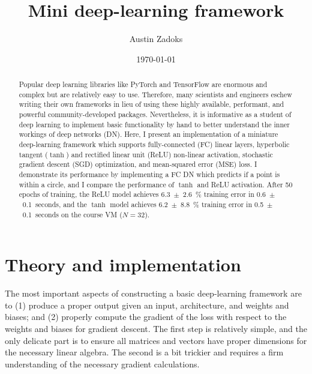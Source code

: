 \documentclass[prl, article, twocolumn]{revtex4-1}
\begin{document}
\title{Mini deep-learning framework}
\date{\today}
\author{Austin Zadoks}
\noaffiliation

\begin{abstract}
Popular deep learning libraries like PyTorch and TensorFlow are enormous and complex but are relatively easy to use. Therefore, many scientists and engineers eschew writing their own frameworks in lieu of using these highly available, performant, and powerful community-developed packages. Nevertheless, it is informative as a student of deep learning to implement basic functionality by hand to better understand the inner workings of deep networks (DN). Here, I present an implementation of a miniature deep-learning framework which supports fully-connected (FC) linear layers, hyperbolic tangent ($\tanh$) and rectified linear unit (ReLU) non-linear activation, stochastic gradient descent (SGD) optimization, and mean-squared error (MSE) loss. I demonstrate its performance by implementing a FC DN which predicts if a point is within a circle, and I compare the performance of $\tanh$ and ReLU activation. After 50 epochs of training, the ReLU model achieves 6.3~$\pm$~2.6~\% training error in 0.6~$\pm$~0.1~seconds, and the $\tanh$ model achieves 6.2~$\pm$~8.8~\% training error in 0.5~$\pm$~0.1~seconds on the course VM ($N=32$).
\end{abstract}

\maketitle

\section{Theory and implementation}
The most important aspects of constructing a basic deep-learning framework are to (1) produce a proper output given an input, architecture, and weights and biases; and (2) properly compute the gradient of the loss with respect to the weights and biases for gradient descent. The first step is relatively simple, and the only delicate part is to ensure all matrices and vectors have proper dimensions for the necessary linear algebra. The second is a bit trickier and requires a firm understanding of the necessary gradient calculations.
\end{document}
